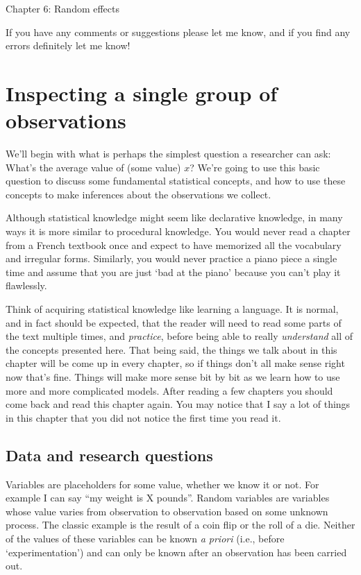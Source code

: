 \documentclass[
]{book}
\begin{document}
Chapter 6: Random effects

If you have any comments or suggestions please let me know, and if you find any errors definitely let me know!

\hypertarget{inspecting-a-single-group-of-observations}{%
\chapter{Inspecting a single group of observations}\label{inspecting-a-single-group-of-observations}}

We'll begin with what is perhaps the simplest question a researcher can ask: What's the average value of (some value) \(x\)? We're going to use this basic question to discuss some fundamental statistical concepts, and how to use these concepts to make inferences about the observations we collect.

Although statistical knowledge might seem like declarative knowledge, in many ways it is more similar to procedural knowledge. You would never read a chapter from a French textbook once and expect to have memorized all the vocabulary and irregular forms. Similarly, you would never practice a piano piece a single time and assume that you are just `bad at the piano' because you can't play it flawlessly.

Think of acquiring statistical knowledge like learning a language. It is normal, and in fact should be expected, that the reader will need to read some parts of the text multiple times, and \emph{practice}, before being able to really \emph{understand} all of the concepts presented here. That being said, the things we talk about in this chapter will be come up in every chapter, so if things don't all make sense right now that's fine. Things will make more sense bit by bit as we learn how to use more and more complicated models. After reading a few chapters you should come back and read this chapter again. You may notice that I say a lot of things in this chapter that you did not notice the first time you read it.

\hypertarget{data-and-research-questions}{%
\section{Data and research questions}\label{data-and-research-questions}}

Variables are placeholders for some value, whether we know it or not. For example I can say ``my weight is X pounds''. Random variables are variables whose value varies from observation to observation based on some unknown process. The classic example is the result of a coin flip or the roll of a die. Neither of the values of these variables can be known \emph{a priori} (i.e., before `experimentation') and can only be known after an observation has been carried out.
\end{document}
